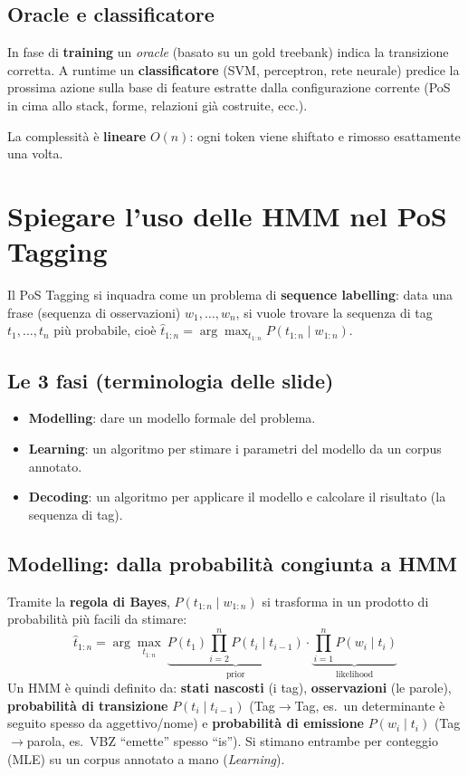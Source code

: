 \documentclass[12pt,a4paper]{article}
\begin{document}
\subsection{Oracle e classificatore}

In fase di \textbf{training} un \emph{oracle} (basato su un gold treebank) indica la transizione corretta. A runtime un \textbf{classificatore} (SVM, perceptron, rete neurale) predice la prossima azione sulla base di feature estratte dalla configurazione corrente (PoS in cima allo stack, forme, relazioni già costruite, ecc.).

La complessità è \textbf{lineare} $O(n)$: ogni token viene shiftato e rimosso esattamente una volta.

\section{Spiegare l'uso delle HMM nel PoS Tagging}

Il PoS Tagging si inquadra come un problema di \textbf{sequence labelling}: data una frase (sequenza di osservazioni) $w_1,\dots,w_n$, si vuole trovare la sequenza di tag $t_1,\dots,t_n$ più probabile, cioè $\hat{t}_{1:n} = \arg\max_{t_{1:n}} P(t_{1:n}\mid w_{1:n})$.

\subsection{Le 3 fasi (terminologia delle slide)}

\begin{defbox}
\begin{itemize}[leftmargin=1.5em]
  \item \textbf{Modelling}: dare un modello formale del problema.
  \item \textbf{Learning}: un algoritmo per stimare i parametri del modello da un corpus annotato.
  \item \textbf{Decoding}: un algoritmo per applicare il modello e calcolare il risultato (la sequenza di tag).
\end{itemize}
\end{defbox}

\subsection{Modelling: dalla probabilità congiunta a HMM}

Tramite la \textbf{regola di Bayes}, $P(t_{1:n}\mid w_{1:n})$ si trasforma in un prodotto di probabilità più facili da stimare:
\[
\hat{t}_{1:n} = \arg\max_{t_{1:n}}\ \underbrace{P(t_1)\prod_{i=2}^{n}P(t_i \mid t_{i-1})}_{\text{prior}}\cdot \underbrace{\prod_{i=1}^{n}P(w_i \mid t_i)}_{\text{likelihood}}
\]
Un HMM è quindi definito da: \textbf{stati nascosti} (i tag), \textbf{osservazioni} (le parole), \textbf{probabilità di transizione} $P(t_i\mid t_{i-1})$ (Tag$\to$Tag, es.\ un determinante è seguito spesso da aggettivo/nome) e \textbf{probabilità di emissione} $P(w_i\mid t_i)$ (Tag$\to$parola, es.\ VBZ ``emette'' spesso ``is''). Si stimano entrambe per conteggio (MLE) su un corpus annotato a mano (\emph{Learning}).
\end{document}
